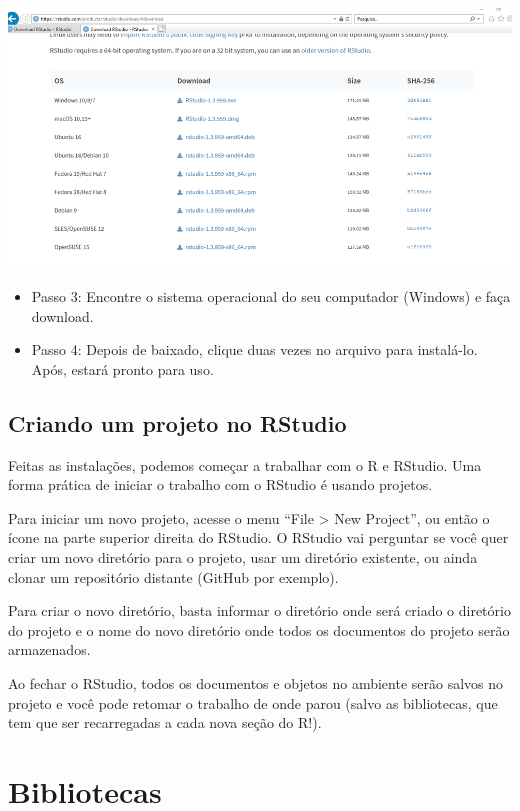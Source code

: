 \documentclass[
  brazil,
]{book}
\providecommand{\tightlist}{%
  \setlength{\itemsep}{0pt}\setlength{\parskip}{0pt}}
\begin{document}
\includegraphics[width=13.54in]{img/inst_1_rstudio}

\begin{itemize}
\tightlist
\item
  Passo 3: Encontre o sistema operacional do seu computador (Windows) e faça download.
\item
  Passo 4: Depois de baixado, clique duas vezes no arquivo para instalá-lo. Após, estará pronto para uso.
\end{itemize}

\hypertarget{criando-um-projeto-no-rstudio}{%
\section{Criando um projeto no RStudio}\label{criando-um-projeto-no-rstudio}}

Feitas as instalações, podemos começar a trabalhar com o R e RStudio. Uma forma prática de iniciar o trabalho com o RStudio é usando projetos.

Para iniciar um novo projeto, acesse o menu ``File \textgreater{} New Project'', ou então o ícone na parte superior direita do RStudio. O RStudio vai perguntar se você quer criar um novo diretório para o projeto, usar um diretório existente, ou ainda clonar um repositório distante (GitHub por exemplo).

Para criar o novo diretório, basta informar o diretório onde será criado o diretório do projeto e o nome do novo diretório onde todos os documentos do projeto serão armazenados.

Ao fechar o RStudio, todos os documentos e objetos no ambiente serão salvos no projeto e você pode retomar o trabalho de onde parou (salvo as bibliotecas, que tem que ser recarregadas a cada nova seção do R!).

\hypertarget{bibliotecas}{%
\chapter{Bibliotecas}\label{bibliotecas}}
\end{document}

